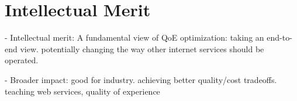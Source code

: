 \section{Intellectual Merit}

- Intellectual merit: A fundamental view of QoE optimization: taking an end-to-end view. potentially changing the way other internet services should be operated.

- Broader impact: good for industry. achieving better quality/cost tradeoffs. teaching web services, quality of experience